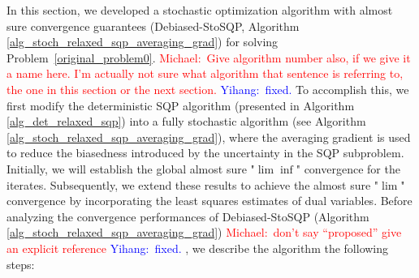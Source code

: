 \documentclass[aos]{imsart}
\numberwithin{equation}{section}
\theoremstyle{plain}
\newcommand{\michael}[1]{\textcolor{red}{Michael:\ #1}}
\newcommand{\yihang}[1]{\textcolor{blue}{Yihang:\ #1}}
\begin{document}
In this section, we developed a stochastic optimization algorithm with almost sure convergence guarantees (Debiased-StoSQP, Algorithm \ref{alg_stoch_relaxed_sqp_averaging_grad}) for solving Problem~\eqref{original_problem0}.  
\michael{Give algorithm number also, if we give it a name here. I'm actually not sure what algorithm that sentence is referring to, the one in this section or the next section.}
\yihang{fixed.}
To accomplish this,
we first modify the deterministic SQP algorithm (presented in Algorithm \ref{alg_det_relaxed_sqp}) into a fully stochastic algorithm (see Algorithm \ref{alg_stoch_relaxed_sqp_averaging_grad}), where the averaging gradient is used to reduce the biasedness introduced by the uncertainty in the SQP subproblem. 
Initially, we will establish the global almost sure "$\lim \inf$" convergence for the iterates. 
Subsequently, we extend these results to achieve the almost sure "$\lim$" convergence by incorporating the least squares estimates of dual variables. Before analyzing the convergence performances of Debiased-StoSQP (Algorithm \ref{alg_stoch_relaxed_sqp_averaging_grad}) 
\michael{don't say ``proposed'' give an explicit reference} \yihang{fixed.}
, we describe the algorithm the following steps:
\end{document}
